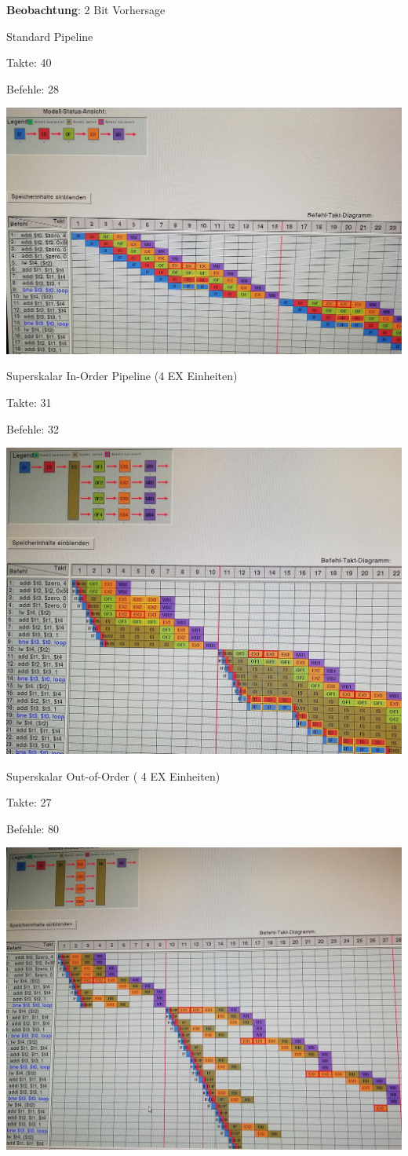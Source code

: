 \documentclass[a4paper,12pt,titlepage]{scrartcl}
\begin{document}
\textbf{Beobachtung}:
2 Bit Vorhersage
\begin{itemize*}
    \item Standard Pipeline
    \begin{itemize*}
        \item Takte: 40
        \item Befehle: 28
        \item \includegraphics[width=.4\linewidth]{Assets/RA2-62418.jpg}
    \end{itemize*}
    \item Superskalar In-Order Pipeline (4 EX Einheiten)
    \begin{itemize*}
        \item Takte: 31
        \item Befehle: 32
        \item \includegraphics[width=.4\linewidth]{Assets/RA2-62729.jpg}
    \end{itemize*}
    \item Superskalar Out-of-Order ( 4 EX Einheiten)
    \begin{itemize*}
        \item Takte: 27
        \item Befehle: 80
        \item \includegraphics[width=.4\linewidth]{Assets/RA2-63122.jpg}
    \end{itemize*}
\end{itemize*}
\end{document}
